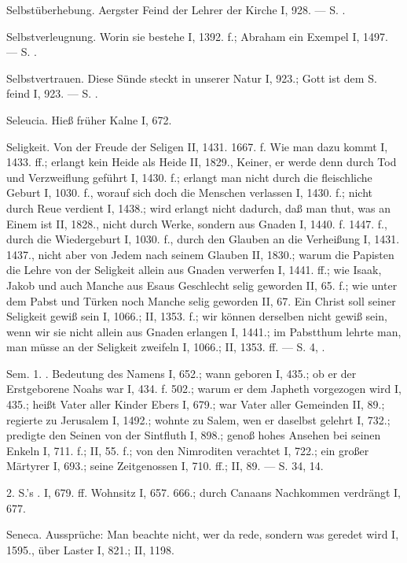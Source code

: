 Selbstüberhebung. Aergster Feind der Lehrer der Kirche I, 928. — S. .

Selbstverleugnung. Worin sie bestehe I, 1392. f.; Abraham ein Exempel I, 1497. — S. .

Selbstvertrauen. Diese Sünde steckt in unserer Natur I, 923.; Gott ist dem S. feind I, 923. — S. .

Seleucia. Hieß früher Kalne I, 672.

Seligkeit. Von der Freude der Seligen II, 1431. 1667. f. Wie man dazu kommt I, 1433. ff.; erlangt kein Heide als Heide II, 1829., Keiner, er werde denn durch Tod und Verzweiflung geführt I, 1430. f.; erlangt man nicht durch die fleischliche Geburt I, 1030. f., worauf sich doch die Menschen verlassen I, 1430. f.; nicht durch Reue verdient I, 1438.; wird erlangt nicht dadurch, daß man thut, was an Einem ist II, 1828., nicht durch Werke, sondern aus Gnaden I, 1440. f. 1447. f., durch die Wiedergeburt I, 1030. f., durch den Glauben an die Verheißung I, 1431. 1437., nicht aber von Jedem nach seinem Glauben II, 1830.; warum die Papisten die Lehre von der Seligkeit allein aus Gnaden verwerfen I, 1441. ff.; wie Isaak, Jakob und auch Manche aus Esaus Geschlecht selig geworden II, 65. f.; wie unter dem Pabst und Türken noch Manche selig geworden II, 67. Ein Christ soll seiner Seligkeit gewiß sein I, 1066.; II, 1353. f.; wir können derselben nicht gewiß sein, wenn wir sie nicht allein aus Gnaden erlangen I, 1441.; im Pabstthum lehrte man, man müsse an der Seligkeit zweifeln I, 1066.; II, 1353. ff. — S.  4, .

Sem. 1. . Bedeutung des Namens I, 652.; wann geboren I, 435.; ob er der Erstgeborene Noahs war I, 434. f. 502.; warum er dem Japheth vorgezogen wird I, 435.; heißt Vater aller Kinder Ebers I, 679.; war Vater aller Gemeinden II, 89.; regierte zu Jerusalem I, 1492.; wohnte zu Salem, wen er daselbst gelehrt I, 732.; predigte den Seinen von der Sintfluth I, 898.; genoß hohes Ansehen bei seinen Enkeln I, 711. f.; II, 55. f.; von den Nimroditen verachtet I, 722.; ein großer Märtyrer I, 693.; seine Zeitgenossen I, 710. ff.; II, 89. — S.  34,  14.

2. S.’s . I, 679. ff. Wohnsitz I, 657. 666.; durch Canaans Nachkommen verdrängt I, 677.

Seneca. Aussprüche: Man beachte nicht, wer da rede, sondern was geredet wird I, 1595., über Laster I, 821.; II, 1198.

